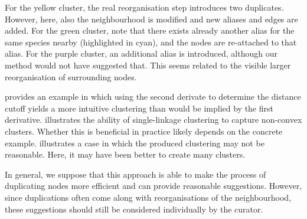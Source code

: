 \documentclass[
	fontsize=10pt, %
	twoside=true, %
	secnumdepth=1, %
  toc=indentunnumbered %
]{kaobook}
\begin{document}
For the yellow cluster, the real reorganisation step introduces two duplicates.
However, here, also the neighbourhood is modified and new aliases and edges are
added.
%
For the green cluster, note that there exists already another alias
for the same species nearby (highlighted in cyan), and the nodes are
re-attached to that alias.
%
For the purple cluster, an additional alias is introduced, although our method
would not have suggested that. This seems related to the visible larger
reorganisation of surrounding nodes.

 provides an example in which using the second derivate to
determine the distance cutoff yields a more intuitive clustering than would be
implied by the first derivative.  illustrates the ability of
single-linkage clustering to capture non-convex clusters. Whether this is
beneficial in practice likely depends on the concrete example. 
illustrates a case in which the produced clustering may not be reasonable.
Here, it may have been better to create many clusters.

In general, we suppose that this approach is able to make the process of
duplicating nodes more efficient and can provide reasonable suggestions.
However, since duplications often come along with reorganisations of the
neighbourhood, these suggestions should still be considered individually by the curator.
\end{document}
